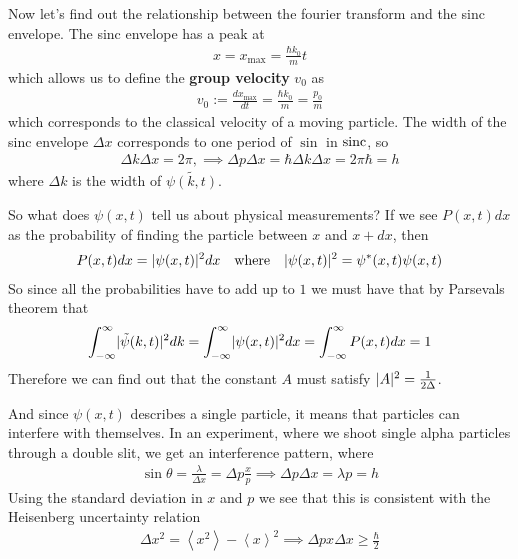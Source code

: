Now let's find out the relationship between the fourier transform and the sinc envelope.
The sinc envelope has a peak at
\begin{align*}
	x = x_{\max} = \frac{\hbar k_0}{m}t
\end{align*}
which allows us to define the \textbf{group velocity} $v_0$ as
\begin{align*}
	v_0 :=\frac{d x_{\max}}{dt} = \frac{\hbar k_0}{m} = \frac{p_0}{m}
\end{align*}
which corresponds to the classical velocity of a moving particle.
The width of the sinc envelope $\Delta x$ corresponds to one period of $\sin$ in $\operatorname{sinc}$, so
\begin{align*}
	\Delta k \Delta x = 2 \pi, \implies \Delta p \Delta x = \hbar \Delta k \Delta x = 2\pi \hbar = h
\end{align*}
where $\Delta k$ is the width of $\tilde{\psi(k,t)}$. 

So what does $\psi(x,t)$ tell us about physical measurements? If we see $P(x,t) dx$ as the probability of finding the particle between $x$ and $x + dx$, then
\begin{align*}
	P(x,t) dx = \vert\psi(x,t)\vert^2 dx \quad \text{where} \quad \vert\psi(x,t)\vert^2 = \psi^*(x,t) \psi(x,t)
\end{align*}
So since all the probabilities have to add up to $1$ we must have that by Parsevals theorem that
\begin{align*}
	\int_{-\infty}^{\infty}\abs{\tilde{\psi}(k,t)}^2 dk = \int_{-\infty}^{\infty} \abs{\psi(x,t)}^2 dx = \int_{-\infty}^{\infty}P(x,t) dx = 1
\end{align*}
Therefore we can find out that the constant $A$ must satisfy $\vert A\vert^2 = \frac{1}{2 \Delta}$.

And since $\psi(x,t)$ describes a single particle, it means that particles can interfere with themselves. 
In an experiment, where we shoot single alpha particles through a double slit, we get an interference pattern, where
\begin{align*}
	\sin \theta = \frac{\lambda}{\Delta x} = \Delta p \frac{x}{p}	\implies \Delta p \Delta x = \lambda p = h
\end{align*}
Using the standard deviation in $x$ and $p$ we see that this is consistent with the Heisenberg uncertainty relation
\begin{align*}
	\Delta x^2 = \left<x^2\right> - \left<x\right>^2 \implies \Delta p x \Delta x \geq \frac{\hbar}{2}
\end{align*}

